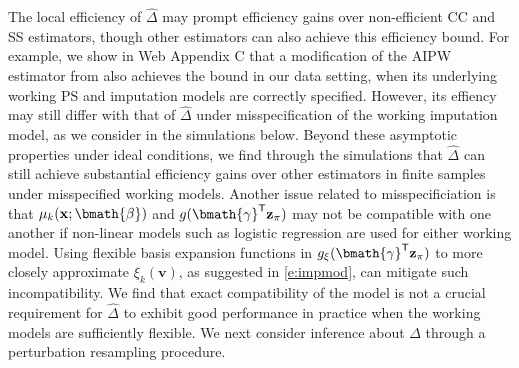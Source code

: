 \documentclass[useAMS,referee,usenatbib]{biom}
\def\bx{\mathbf{x}}
\def\bz{\mathbf{z}}
\def\bv{\mathbf{v}}
\def\bgam{\bmath{\gamma}}
\def\bbeta{\bmath{\beta}}
\def\Delthat{\widehat{\Delta}}
\def\trans{^{\sf \tiny T}}
\def\bzpi{\bz_{\pi}}
\def\bzpi{\bz_{\pi}}
\begin{document}
The local efficiency of $\Delthat$ may prompt efficiency gains over non-efficient CC and SS estimators, though other estimators
can also achieve this efficiency bound.  For example, we show in Web Appendix C that a modification of the AIPW estimator 
from \cite{davidian2005semiparametric} also achieves the bound in our data setting, when its underlying working PS and
imputation models are correctly specified.  However, its effiency may still differ with that of $\Delthat$ under misspecification
of the working imputation model, as we consider in the simulations below.  Beyond these asymptotic properties under ideal 
conditions, we find through the simulations that $\Delthat$ can still achieve substantial efficiency gains over other estimators 
in finite samples under misspecified working models.  Another issue related to misspecificiation is that $\mu_k(\bx;\bbeta)$ 
and $g(\bgam\trans\bzpi)$ may not be compatible with one another if non-linear models such as logistic 
regression are used for either working model.  Using flexible basis expansion functions in $g_{\xi}(\bgam\trans\bzpi)$ to 
more closely approximate $\xi_k(\bv)$, as suggested in \ref{e:impmod}, can mitigate such incompatibility.  We find that
exact compatibility of the model is not a crucial requirement for $\Delthat$ to exhibit good performance in practice when
the working models are sufficiently flexible.
We next consider inference about $\Delta$ through a perturbation resampling procedure.
\end{document}

